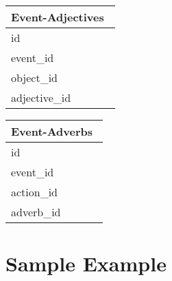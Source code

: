 \documentclass[10pt]{article}
\begin{document}
\begin{multicols}{2}
\begin{tabular}{|p{0.95\linewidth}|} 
\hline                   
\textbf{Event-Adjectives}
\\
\hline
id\\
\hline
event\_id\\
\hline
object\_id\\
\hline
adjective\_id\\
\hline
\end{tabular}



\begin{tabular}{|p{0.95\linewidth}|} 
\hline                   
\textbf{Event-Adverbs}
\\
\hline
id\\
\hline
event\_id\\
\hline
action\_id\\
\hline
adverb\_id\\
\hline
\end{tabular}

\end{multicols}

\section{Sample Example}









 
\end{document}
